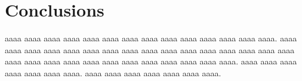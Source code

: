 \documentclass[12pt,openany,english]{jsbook}        %
\begin{document}
%
%
%
\chapter{Conclusions}
%
%
%
\begin{doublespace}
%
aaaa aaaa aaaa aaaa aaaa aaaa aaaa 
aaaa aaaa aaaa aaaa aaaa aaaa aaaa. 
aaaa aaaa aaaa aaaa aaaa aaaa aaaa 
aaaa aaaa aaaa aaaa aaaa aaaa aaaa 
aaaa aaaa aaaa aaaa aaaa aaaa aaaa 
aaaa aaaa aaaa aaaa aaaa aaaa aaaa. 
aaaa aaaa aaaa aaaa aaaa aaaa aaaa. 
aaaa aaaa aaaa aaaa aaaa aaaa aaaa. 
%
\end{doublespace}
%
%
%
\end{document}
